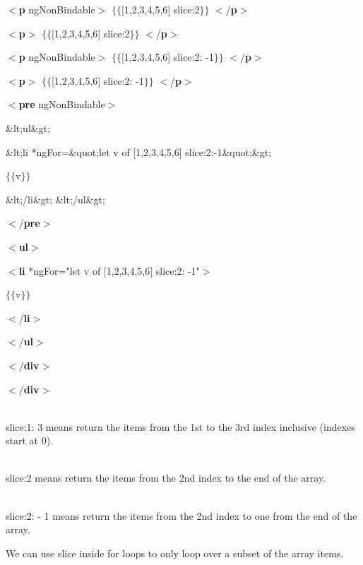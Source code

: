 \documentclass{article}
\begin{document}
$\mathrm{<}$\textbf{p} ngNonBindable$\mathrm{>}$ $\mathrm{\{}$$\mathrm{\{}$[1,2,3,4,5,6] {\textbar} slice:2$\mathrm{\}}$$\mathrm{\}}$ $\mathrm{<}$/\textbf{p}$\mathrm{>}$

$\mathrm{<}$\textbf{p}$\mathrm{>}$ $\mathrm{\{}$$\mathrm{\{}$[1,2,3,4,5,6] {\textbar} slice:2$\mathrm{\}}$$\mathrm{\}}$ $\mathrm{<}$/\textbf{p}$\mathrm{>}$

$\mathrm{<}$\textbf{p} ngNonBindable$\mathrm{>}$ $\mathrm{\{}$$\mathrm{\{}$[1,2,3,4,5,6] {\textbar} slice:2: -1$\mathrm{\}}$$\mathrm{\}}$ $\mathrm{<}$/\textbf{p}$\mathrm{>}$

$\mathrm{<}$\textbf{p}$\mathrm{>}$ $\mathrm{\{}$$\mathrm{\{}$[1,2,3,4,5,6] {\textbar} slice:2: -1$\mathrm{\}}$$\mathrm{\}}$ $\mathrm{<}$/\textbf{p}$\mathrm{>}$

$\mathrm{<}$\textbf{pre} ngNonBindable$\mathrm{>}$

\noindent \&lt;ul\&gt;

\noindent \&lt;li  *ngFor=\&quot;let  v  of  [1,2,3,4,5,6]  {\textbar} slice:2:-1\&quot;\&gt;

$\mathrm{\{}$$\mathrm{\{}$v$\mathrm{\}}$$\mathrm{\}}$

\&lt;/li\&gt; \&lt;/ul\&gt;

$\mathrm{<}$/\textbf{pre}$\mathrm{>}$

$\mathrm{<}$\textbf{ul}$\mathrm{>}$

$\mathrm{<}$\textbf{li} *ngFor="let v of [1,2,3,4,5,6] {\textbar} slice:2: -1"$\mathrm{>}$

$\mathrm{\{}$$\mathrm{\{}$v$\mathrm{\}}$$\mathrm{\}}$

$\mathrm{<}$/\textbf{li}$\mathrm{>}$

$\mathrm{<}$/\textbf{ul}$\mathrm{>}$

$\mathrm{<}$/\textbf{div}$\mathrm{>}$

\noindent $\mathrm{<}$/\textbf{div}$\mathrm{>}$

\noindent \\ slice:1: 3 means return the items from the 1st to the 3rd index inclusive (indexes start at 0).

\noindent \\ slice:2 means return the items from the 2nd index to the end of the array.

\noindent \\ slice:2: - 1 means return the items from the 2nd index to one from the end of the array.

\noindent We can use slice inside for loops to only loop over a subset of the array items.
\end{document}
